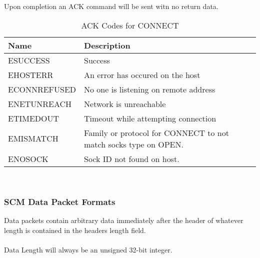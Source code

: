 \documentclass[10pt]{article}
\begin{document}
    Upon completion an ACK command will be sent witn no return data. 
	\\
	\begin{table}[H]
		\begin{center}
			\caption{ACK Codes for CONNECT}
			\label{tab:connErrTable}
			\begin{tabular}{l|l} 
				\rowcolor{lightgray}
				\textbf{Name} & \textbf{Description}\\
				\hline
				ESUCCESS & Success\\
				EHOSTERR & An error has occured on the host\\
				ECONNREFUSED & No one is listening on remote address\\
				ENETUNREACH & Network is unreachable\\
				ETIMEDOUT & Timeout while attempting connection\\
				EMISMATCH & Family or protocol for CONNECT to not match socks type on OPEN.\\
				ENOSOCK & Sock ID not found on host. \\
			\end{tabular}
		\end{center}
	\end{table} \mbox{}\\
	\subsubsection{SCM Data Packet Formats} \mbox{}
	Data packets contain arbitrary data immediately after the header of whatever length is contained in the headers length field. \\
	\\
	Data Length will always be an unsigned 32-bit integer. 
\end{document}
